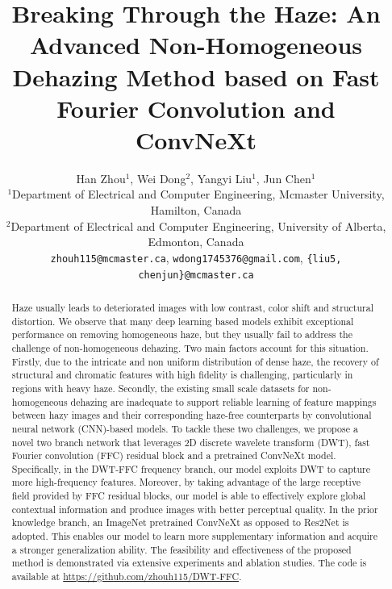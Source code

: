 \documentclass[10pt,twocolumn,letterpaper]{article}
\begin{document}
\title{Breaking Through the Haze: An Advanced Non-Homogeneous Dehazing Method based on Fast Fourier Convolution and ConvNeXt}

\author{Han Zhou$^1$, Wei Dong$^2$, Yangyi Liu$^1$, Jun Chen$^1$\\
$^1$Department of Electrical and Computer Engineering, Mcmaster University, Hamilton, Canada\\
$^2$Department of Electrical and Computer Engineering, University of Alberta, Edmonton, Canada\\
{\tt\small zhouh115@mcmaster.ca}, {\tt\small wdong1745376@gmail.com}, {\tt\small \{liu5, chenjun\}@mcmaster.ca}
}
\maketitle


\begin{abstract}
   Haze usually leads to deteriorated images with low contrast, color shift and structural distortion. We observe that many deep learning based models exhibit exceptional performance on removing homogeneous haze, but they usually fail to address the challenge of non-homogeneous dehazing. Two main factors account for this situation. Firstly, due to the intricate and non uniform distribution of dense haze, the recovery of structural and chromatic features with high fidelity is challenging, particularly in regions with heavy haze. Secondly, the existing small scale datasets for non-homogeneous dehazing are inadequate to support reliable learning of feature mappings between hazy images and their corresponding haze-free counterparts by convolutional neural network (CNN)-based models. To tackle these two challenges, we propose a novel two branch network that leverages 2D discrete wavelete transform (DWT), fast Fourier convolution (FFC) residual block and a pretrained ConvNeXt model. Specifically, in the DWT-FFC frequency branch, our model exploits DWT to capture more high-frequency features. Moreover, by taking advantage of the large receptive field provided by FFC residual blocks, our model is able to effectively explore global contextual information and produce images with better perceptual quality. In the prior knowledge branch, an ImageNet pretrained ConvNeXt as opposed to Res2Net is adopted. This enables our model to learn more supplementary information and acquire a stronger generalization ability. The feasibility and effectiveness of the proposed method is demonstrated via extensive experiments and ablation studies. The code is available at \url{https://github.com/zhouh115/DWT-FFC}.
\end{abstract}
\end{document}
